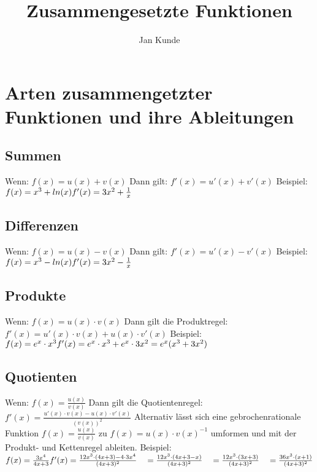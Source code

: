 \documentclass{article}
\title{Zusammengesetzte Funktionen}
\author{Jan Kunde}
\date{}
\begin{document}
\maketitle
\raggedright
\section*{Arten zusammengetzter Funktionen und ihre Ableitungen}
    \subsection*{Summen}
        Wenn: \break
        $f(x) = u(x) + v(x)$
        \break
        Dann gilt:\break
        $f'(x) = u'(x) + v'(x)$
        \break \break        
        Beispiel: \break \break
        $f(x) = x^3 + ln(x) \break f'(x) = 3x^2+\frac{1}{x}$

    \subsection*{Differenzen}
    Wenn: \break
    $f(x) = u(x) - v(x)$
    \break
    Dann gilt:\break
    $f'(x) = u'(x) - v'(x)$
    \break \break
    Beispiel: \break \break
    $f(x) = x^3 - ln(x) \break f'(x) = 3x^2 - \frac{1}{x}$

    \pagebreak
    
    \subsection*{Produkte}
    Wenn: \break
    $f(x) = u(x) \cdot v(x)$
    \break
    Dann gilt die Produktregel:\break
    $f'(x) = u'(x) \cdot v(x) + u(x) \cdot v'(x)$
    \break \break
    Beispiel: \break \break
    $f(x) = e^x \cdot x^3 \break
    f'(x) = e^x \cdot x^3 + e^x \cdot 3x^2 = e^x(x^3+3x^2)$
    


    \subsection*{Quotienten}
    Wenn: \break
    $f(x) = \frac{u(x)}{v(x)}$
    \break
    Dann gilt die Quotientenregel: \break
    $f'(x) = \frac{u'(x)\cdot v(x) - u(x) \cdot v'(x)}{(v(x))^2}$
    Alternativ lässt sich eine gebrochenrationale Funktion 
    $f(x) = \frac{u(x)}{v(x)}$ zu $f(x) = u(x) \cdot v(x)^{-1}$
    umformen und mit der Produkt- und Kettenregel ableiten.
    \break \break
    Beispiel: \break \break
    $f(x) = \frac{3x^4}{4x+3}\break 
    f'(x) = \frac{12x^3 \cdot (4x+3) - 4 \cdot 3x^4}{(4x+3)^2} \break
    \quad = \frac{12x^3 \cdot (4x+3-x)}{(4x+3)^2}\break
    \quad = \frac{12x^3 \cdot (3x+3)}{(4x+3)^2}\break
    \quad = \frac{36x^3 \cdot (x+1)}{(4x+3)^2}$
\end{document}
